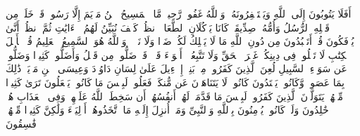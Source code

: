 \stopbuffer%
\startbuffer[\q:5:74]
أَفَلَا یَتُوبُونَ إِلَى ٱللَّهِ وَیَسۡتَغۡفِرُونَهُۥۚ وَٱللَّهُ غَفُورࣱ رَّحِیمࣱ%
\stopbuffer%
\startbuffer[\q:5:75]
مَّا ٱلۡمَسِیحُ ٱبۡنُ مَرۡیَمَ إِلَّا رَسُولࣱ قَدۡ خَلَتۡ مِن قَبۡلِهِ ٱلرُّسُلُ وَأُمُّهُۥ صِدِّیقَةࣱۖ كَانَا یَأۡكُلَانِ ٱلطَّعَامَۗ ٱنظُرۡ كَیۡفَ نُبَیِّنُ لَهُمُ ٱلۡءَایَٰتِ ثُمَّ ٱنظُرۡ أَنَّىٰ یُؤۡفَكُونَ%
\stopbuffer%
\startbuffer[\q:5:76]
قُلۡ أَتَعۡبُدُونَ مِن دُونِ ٱللَّهِ مَا لَا یَمۡلِكُ لَكُمۡ ضَرࣰّا وَلَا نَفۡعࣰاۚ وَٱللَّهُ هُوَ ٱلسَّمِیعُ ٱلۡعَلِیمُ%
\stopbuffer%
\startbuffer[\q:5:77]
قُلۡ یَٰۤأَهۡلَ ٱلۡكِتَٰبِ لَا تَغۡلُوا۟ فِی دِینِكُمۡ غَیۡرَ ٱلۡحَقِّ وَلَا تَتَّبِعُوۤا۟ أَهۡوَاۤءَ قَوۡمࣲ قَدۡ ضَلُّوا۟ مِن قَبۡلُ وَأَضَلُّوا۟ كَثِیرࣰا وَضَلُّوا۟ عَن سَوَاۤءِ ٱلسَّبِیلِ%
\stopbuffer%
\startbuffer[\q:5:78]
لُعِنَ ٱلَّذِینَ كَفَرُوا۟ مِنۢ بَنِیۤ إِسۡرَٰۤءِیلَ عَلَىٰ لِسَانِ دَاوُۥدَ وَعِیسَى ٱبۡنِ مَرۡیَمَۚ ذَٰلِكَ بِمَا عَصَوا۟ وَّكَانُوا۟ یَعۡتَدُونَ%
\stopbuffer%
\startbuffer[\q:5:79]
كَانُوا۟ لَا یَتَنَاهَوۡنَ عَن مُّنكَرࣲ فَعَلُوهُۚ لَبِئۡسَ مَا كَانُوا۟ یَفۡعَلُونَ%
\stopbuffer%
\startbuffer[\q:5:80]
تَرَىٰ كَثِیرࣰا مِّنۡهُمۡ یَتَوَلَّوۡنَ ٱلَّذِینَ كَفَرُوا۟ۚ لَبِئۡسَ مَا قَدَّمَتۡ لَهُمۡ أَنفُسُهُمۡ أَن سَخِطَ ٱللَّهُ عَلَیۡهِمۡ وَفِی ٱلۡعَذَابِ هُمۡ خَٰلِدُونَ%
\stopbuffer%
\startbuffer[\q:5:81]
وَلَوۡ كَانُوا۟ یُؤۡمِنُونَ بِٱللَّهِ وَٱلنَّبِیِّ وَمَاۤ أُنزِلَ إِلَیۡهِ مَا ٱتَّخَذُوهُمۡ أَوۡلِیَاۤءَ وَلَٰكِنَّ كَثِیرࣰا مِّنۡهُمۡ فَٰسِقُونَ%
\stopbuffer%
